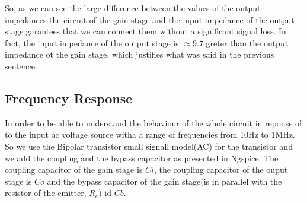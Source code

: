 So, as we can see the large difference between the values of the output impedances the circuit of
the gain stage and the input impedance of the output stage garantees that we can connect them without
a significant signal loss.
In fact, the input impedance of the output stage is $\approx 9.7$ greter than the output impedance ot the gain stage,
which justifies what was said in the previous sentence.

\subsection{Frequency Response}

In order to be able to understand the behaviour of the whole circuit in reponse of to the input ac voltage source witha
a range of frequencies from 10Hz to 1MHz.
So we use the Bipolar transistor small signall model(AC) for the transistor and we add the coupling and the bypass capacitor as presented in
Ngspice. The coupling capacitor of the gain stage is $Ci$, the coupling capacitor of the ouput stage is $Co$ and the bypass
capacitor of the gain stage(is in parallel with the resistor of the emitter, $R_e$) id $Cb$.


